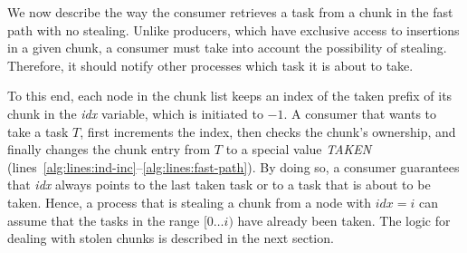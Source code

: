 We now describe the way the consumer retrieves a task from a chunk in the fast path with no stealing. 
Unlike producers, which have exclusive access to insertions in a given chunk, a consumer must take into account the possibility of stealing. 
Therefore, it should notify other processes which task it is about to take. 

To this end, each node in the chunk list keeps an index of the taken prefix of its chunk in the \emph{idx} variable, which is initiated to $-1$. 
A consumer that wants to take a task $T$, first increments the index, then checks the chunk's ownership, and finally changes the chunk entry from $T$ to a special value \emph{TAKEN} (lines~\ref{alg:lines:ind-inc}--\ref{alg:lines:fast-path}). By doing so, a consumer guarantees that \emph{idx} always points to the last taken task or to a task that is about to be taken. Hence, a process that is stealing a chunk from a node with $\textit{idx} = i$ can assume that the tasks in the range $[0 \ldots i)$ have already been taken. The logic for dealing with stolen chunks is described in the next section.




